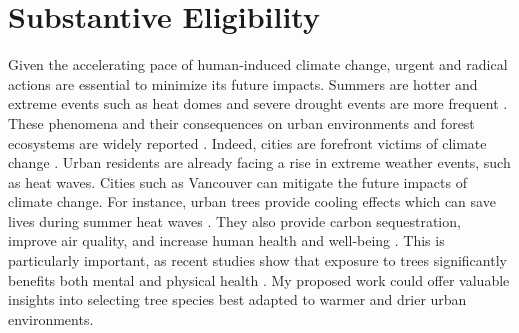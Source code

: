 \documentclass[11pt,letter]{article}
\begin{document}
\section *{Substantive Eligibility} 
Given the accelerating pace of human-induced climate change, urgent and radical actions are essential to minimize its future impacts. Summers are hotter and extreme events such as heat domes and severe drought events are more frequent \citep{zhang_increased_2023}. These phenomena and their consequences on urban environments and forest ecosystems are widely reported \citep{allen_global_2010, mccarthy_climate_2010}. Indeed, cities are forefront victims of climate change \citep{das_unraveling_2024, corburn_cities_2009}. Urban residents are already facing a rise in extreme weather events, such as heat waves\citep{das_unraveling_2024}. Cities such as Vancouver can mitigate the future impacts of climate change. For instance, urban trees provide cooling effects which can save lives during summer heat waves \citep{ettinger_street_2024, zandler_cooling_2024}. They also provide carbon sequestration, improve air quality, and increase human health and well-being \citep{wolf_urban_2020}. This is particularly important, as recent studies show that exposure to trees significantly benefits both mental and physical health  \citep{wolf_urban_2020, turnerskoff_benefits_2019}. My proposed work could offer valuable insights into selecting tree species best adapted to warmer and drier urban environments.
\end{document}

